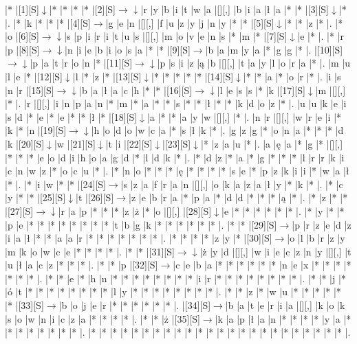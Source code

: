 \documentclass[11pt]{article}
\newcommand\drarr{$\rightarrow \!\!\!\!\! \downarrow$}
\newcommand\rarr{$\rightarrow$}
\newcommand\darr{$\downarrow$}
\begin{document}
\noindent\begin{Puzzle}{23}{27}|*	|[1][S]\darr	|*	|*	|*	|*	|[2][S]\drarr	|r	|y	|b	|i	|t	|w	|a	|[][,]{ }	|b	|i	|a	|ł	|a	|*	|*	|[3][S]\darr	|*	|.
|*	|k	|*	|*	|*	|[4][S]\rarr	|g	|e	|n	|[][,]{ }	|f	|u	|z	|y	|j	|n	|y	|*	|*	|[5][S]\darr	|*	|*	|z	|*	|.
|*	|o	|[6][S]\drarr	|s	|p	|i	|r	|i	|t	|u	|s	|[][,]{ }	|m	|o	|v	|e	|n	|s	|*	|m	|*	|[7][S]\darr	|e	|*	|.
|*	|r	|p	|[8][S]\drarr	|n	|i	|e	|b	|i	|o	|s	|a	|*	|*	|[9][S]\rarr	|b	|a	|m	|y	|a	|*	|g	|g	|*	|.
|[10][S]\drarr	|p	|a	|t	|r	|o	|n	|*	|[11][S]\drarr	|p	|s	|i	|z	|ą	|b	|[][,]{ }	|t	|a	|y	|l	|o	|r	|a	|*	|.
|m	|u	|l	|e	|*	|[12][S]\darr	|l	|*	|z	|*	|[13][S]\darr	|*	|*	|*	|*	|*	|[14][S]\darr	|*	|*	|a	|*	|o	|r	|*	|.
|i	|s	|n	|r	|[15][S]\drarr	|b	|a	|ł	|a	|c	|h	|*	|*	|[16][S]\drarr	|l	|e	|s	|s	|*	|k	|[17][S]\darr	|m	|[][,]{ }	|*	|.
|r	|[][,]{ }	|i	|n	|p	|a	|n	|*	|m	|*	|a	|*	|*	|s	|*	|*	|ł	|*	|*	|k	|d	|o	|z	|*	|.
|u	|u	|k	|e	|i	|s	|d	|*	|e	|*	|e	|*	|*	|ł	|*	|[18][S]\darr	|a	|*	|*	|a	|y	|w	|[][,]{ }	|*	|.
|n	|r	|[][,]{ }	|w	|r	|e	|i	|*	|k	|*	|n	|[19][S]\drarr	|h	|o	|d	|o	|w	|c	|a	|*	|s	|ł	|k	|*	|.
|g	|z	|g	|*	|o	|n	|a	|*	|*	|*	|d	|k	|[20][S]\darr	|w	|[21][S]\darr	|t	|i	|[22][S]\darr	|[23][S]\darr	|*	|z	|a	|u	|*	|.
|a	|ę	|a	|*	|g	|*	|[][,]{ }	|*	|*	|*	|e	|o	|d	|i	|h	|o	|a	|g	|d	|*	|l	|d	|k	|*	|.
|*	|d	|z	|*	|a	|*	|g	|*	|*	|*	|l	|r	|r	|k	|i	|c	|n	|w	|z	|*	|o	|c	|u	|*	|.
|*	|n	|o	|*	|*	|*	|ę	|*	|*	|*	|*	|s	|e	|*	|p	|z	|k	|i	|i	|*	|w	|a	|ł	|*	|.
|*	|i	|w	|*	|*	|[24][S]\rarr	|s	|z	|a	|f	|r	|a	|n	|[][,]{ }	|o	|k	|a	|z	|a	|ł	|y	|*	|k	|*	|.
|*	|c	|y	|*	|*	|[25][S]\darr	|t	|[26][S]\rarr	|z	|e	|b	|r	|a	|*	|p	|a	|*	|d	|d	|*	|*	|*	|ą	|*	|.
|*	|z	|*	|*	|[27][S]\drarr	|r	|a	|p	|*	|*	|*	|z	|ż	|*	|o	|[][,]{ }	|[28][S]\darr	|e	|*	|*	|*	|*	|*	|*	|.
|*	|y	|*	|*	|p	|e	|*	|*	|*	|*	|*	|*	|*	|*	|t	|b	|g	|k	|*	|*	|*	|*	|*	|*	|.
|*	|*	|[29][S]\rarr	|p	|r	|z	|e	|d	|z	|i	|a	|ł	|*	|*	|a	|a	|r	|*	|*	|*	|*	|*	|*	|*	|.
|*	|*	|*	|*	|z	|y	|*	|[30][S]\rarr	|o	|l	|b	|r	|z	|y	|m	|k	|o	|w	|c	|e	|*	|*	|*	|*	|.
|*	|*	|[31][S]\drarr	|ż	|y	|d	|[][,]{ }	|w	|i	|e	|c	|z	|n	|y	|[][,]{ }	|t	|u	|ł	|a	|c	|z	|*	|*	|*	|.
|*	|*	|p	|[32][S]\rarr	|c	|e	|b	|a	|*	|*	|*	|*	|*	|*	|n	|e	|x	|*	|*	|*	|*	|*	|*	|*	|.
|*	|*	|e	|*	|h	|n	|*	|*	|*	|*	|*	|*	|*	|*	|i	|r	|*	|*	|*	|*	|*	|*	|*	|*	|.
|*	|*	|j	|*	|ó	|t	|*	|*	|*	|*	|*	|*	|*	|*	|l	|y	|*	|*	|*	|*	|*	|*	|*	|*	|.
|*	|*	|z	|*	|w	|u	|*	|*	|*	|*	|*	|*	|[33][S]\rarr	|b	|o	|j	|e	|r	|*	|*	|*	|*	|*	|*	|.
|[34][S]\rarr	|b	|a	|t	|e	|r	|i	|a	|[][,]{ }	|k	|o	|k	|s	|o	|w	|n	|i	|c	|z	|a	|*	|*	|*	|*	|.
|*	|*	|ż	|[35][S]\rarr	|k	|a	|p	|ł	|a	|n	|*	|*	|*	|*	|y	|a	|*	|*	|*	|*	|*	|*	|*	|*	|.
|*	|*	|*	|*	|*	|*	|*	|*	|*	|*	|*	|*	|*	|*	|*	|*	|*	|*	|*	|*	|*	|*	|*	|*	|.\end{Puzzle}
\end{document}
